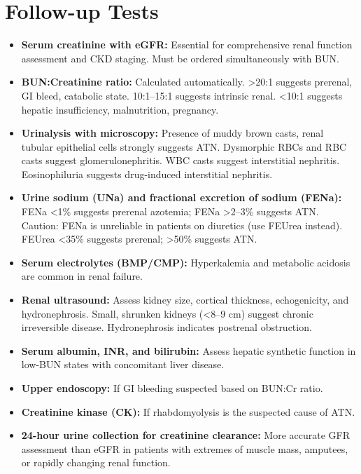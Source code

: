 \section*{Follow-up Tests}
\begin{itemize}
  \item \textbf{Serum creatinine with eGFR:} Essential for comprehensive renal function assessment and CKD staging. Must be ordered simultaneously with BUN.
  \item \textbf{BUN:Creatinine ratio:} Calculated automatically. >20:1 suggests prerenal, GI bleed, catabolic state. 10:1--15:1 suggests intrinsic renal. <10:1 suggests hepatic insufficiency, malnutrition, pregnancy.
  \item \textbf{Urinalysis with microscopy:} Presence of muddy brown casts, renal tubular epithelial cells strongly suggests ATN. Dysmorphic RBCs and RBC casts suggest glomerulonephritis. WBC casts suggest interstitial nephritis. Eosinophiluria suggests drug-induced interstitial nephritis.
  \item \textbf{Urine sodium (UNa) and fractional excretion of sodium (FENa):} FENa <1\% suggests prerenal azotemia; FENa >2--3\% suggests ATN. Caution: FENa is unreliable in patients on diuretics (use FEUrea instead). FEUrea <35\% suggests prerenal; >50\% suggests ATN.
  \item \textbf{Serum electrolytes (BMP/CMP):} Hyperkalemia and metabolic acidosis are common in renal failure.
  \item \textbf{Renal ultrasound:} Assess kidney size, cortical thickness, echogenicity, and hydronephrosis. Small, shrunken kidneys (<8--9 cm) suggest chronic irreversible disease. Hydronephrosis indicates postrenal obstruction.
  \item \textbf{Serum albumin, INR, and bilirubin:} Assess hepatic synthetic function in low-BUN states with concomitant liver disease.
  \item \textbf{Upper endoscopy:} If GI bleeding suspected based on BUN:Cr ratio.
  \item \textbf{Creatinine kinase (CK):} If rhabdomyolysis is the suspected cause of ATN.
  \item \textbf{24-hour urine collection for creatinine clearance:} More accurate GFR assessment than eGFR in patients with extremes of muscle mass, amputees, or rapidly changing renal function.
\end{itemize}

